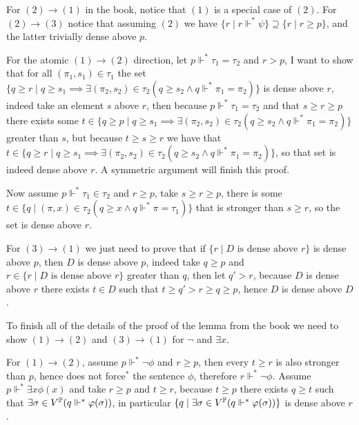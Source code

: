 \begin{cExercise}[][][author][4]
	\begin{cPart}
		For $(2)\to (1)$ in the book, notice that $(1)$ is a special case of $(2)$.
		For $(2)\to (3)$ notice that assuming $(2)$ we have $\{r\mid r\Vdash^* \psi\}\supseteq \{r\mid r\ge p\}$, and the latter trivially dense above $p$.
		
		For the atomic $(1)\to(2)$ direction, let $p\Vdash^*\tau_1=\tau_2$ and $r>p$, I want to show that for all $(\pi_1,s_1)\in\tau_1$ the set $\{q\ge r\mid q\ge s_1\implies \exists(\pi_2,s_2)\in\tau_2(q\ge s_2\land q\Vdash^*\pi_1=\pi_2)\}$ is dense above $r$, indeed take an element $s$ above $r$, then because $p\Vdash^*\tau_1=\tau_2$ and that $s\ge r\ge p$ there exists some $t\in \{q\ge p\mid q\ge s_1\implies \exists(\pi_2,s_2)\in\tau_2(q\ge s_2\land q\Vdash^*\pi_1=\pi_2)\}$ greater than $s$, but because $t\ge s\ge r$ we have that $t\in \{q\ge r\mid q\ge s_1\implies \exists(\pi_2,s_2)\in\tau_2(q\ge s_2\land q\Vdash^*\pi_1=\pi_2)\}$, so that set is indeed dense above $r$. A symmetric argument will finish this proof.
		
		Now assume $p\Vdash^* \tau_1\in\tau_2$ and $r\ge p$, take $s\ge r\ge p$, there is some $t\in\{q\mid (\pi,x)\in\tau_2(q\ge x\land q\Vdash^*\pi=\tau_1)\}$ that is stronger than $s\ge r$, so the set is dense above $r$.
		
		For $(3)\to(1)$ we just need to prove that if $\{r\mid D\text{ is dense above }r\}$ is dense above $p$, then $D$ is dense above $p$, indeed take $q\ge p$ and $r\in \{r\mid D\text{ is dense above }r\}$ greater than $q$, then let $q'>r$, because $D$ is dense above $r$ there exists $t\in D$ such that $t\ge q'>r\ge q\ge p$, hence $D$ is dense above $D$.
		
		To finish all of the details of the proof of the lemma from the book we need to show $(1)\to(2)$ and $(3)\to(1)$ for $\lnot$ and $\exists x$.
		
		For $(1)\to(2)$, assume $p\Vdash^*\lnot\phi$ and $r\ge p$, then every $t\ge r$ is also stronger than $p$, hence does not force$^*$ the sentence $\phi$, therefore $r\Vdash^* \lnot\phi$. Assume $p\Vdash^*\exists x \phi(x)$ and take $r\ge p$ and $t\ge r$, because $t\ge p$ there exists $q\ge t$ such that $\exists \sigma\in V^\Bbb P (q\Vdash^* \phi(\sigma))$, in particular $\{q\mid \exists \sigma\in V^\Bbb P (q\Vdash^* \phi(\sigma))\}$ is dense above $r$.
		

\end{cPart}
\end{cExercise}
